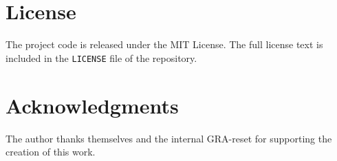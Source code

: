 \documentclass[11pt,a4paper]{article}
\begin{document}
\section*{License}

The project code is released under the MIT License.
The full license text is included in the \texttt{LICENSE} file of the repository.

\section*{Acknowledgments}

The author thanks themselves and the internal GRA-reset for supporting the creation of this work.
\end{document}
